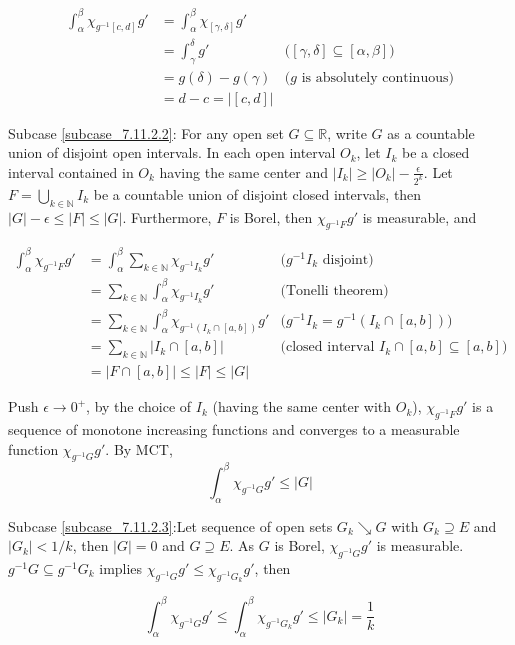 \documentclass{article}
\newcommand\N{\mathbb{N}}
\newcommand\R{\mathbb{R}}
\begin{document}
\begin{align*}
    \int_\alpha^\beta \chi_{g^{-1}[c, d]} g'
    &= \int_\alpha^\beta \chi_{[\gamma, \delta]} g'\\
    &= \int_\gamma^\delta  g' &\text{($[\gamma, \delta] \subseteq [\alpha, \beta]$)} \\
    &= g(\delta) - g(\gamma) &\text{($g$ is absolutely continuous)} \\
    &= d - c = |[c, d]|
\end{align*}

Subcase \ref{subcase_7.11.2.2}: For any open set $G \subseteq \R$, write $G$ as a countable union of disjoint open intervals. In each open interval $O_k$, let $I_k$ be a closed interval contained in $O_k$ having the same center and $|I_k| \geq |O_k| - \frac{\epsilon}{2^k}$. Let $F = \bigcup_{k \in \N} I_k$ be a countable union of disjoint closed intervals, then $|G| - \epsilon \leq |F| \leq |G|$. Furthermore, $F$ is Borel, then $\chi_{g^{-1} F} g'$ is measurable, and

\begin{align*}
    \int_\alpha^\beta \chi_{g^{-1} F} g'
    &= \int_\alpha^\beta \sum_{k \in \N} \chi_{g^{-1} I_k} g' &\text{($g^{-1} I_k$ disjoint)}\\
    &= \sum_{k \in \N} \int_\alpha^\beta \chi_{g^{-1} I_k} g' &\text{(Tonelli theorem)}\\
    &= \sum_{k \in \N} \int_\alpha^\beta \chi_{g^{-1}(I_k \cap [a, b])} g' &\text{($g^{-1} I_k = g^{-1}(I_k \cap [a, b])$)} \\
    &= \sum_{k \in \N} |I_k \cap [a, b]| &\text{(closed interval $I_k \cap [a, b] \subseteq [a, b]$)} \\
    &= |F \cap [a, b]| \leq |F| \leq |G|
\end{align*}

Push $\epsilon \to 0^+$, by the choice of $I_k$ (having the same center with $O_k$), $\chi_{g^{-1} F} g'$ is a sequence of monotone increasing functions and converges to a measurable function $\chi_{g^{-1} G} g'$. By MCT,
\[
    \int_\alpha^\beta \chi_{g^{-1} G} g' \leq |G|
\]

Subcase \ref{subcase_7.11.2.3}:Let sequence of open sets $G_k \searrow G$ with $G_k \supseteq E$ and $|G_k| < 1/k$, then $|G| = 0$ and $G \supseteq E$. As $G$ is Borel, $\chi_{g^{-1}G} g'$ is measurable. $g^{-1} G \subseteq g^{-1} G_k$ implies $\chi_{g^{-1} G} g' \leq \chi_{g^{-1} G_k} g'$, then

\[
    \int_\alpha^\beta \chi_{g^{-1} G} g' \leq \int_\alpha^\beta \chi_{g^{-1} G_k} g' \leq |G_k| = \frac{1}{k} 
\]
\end{document}
